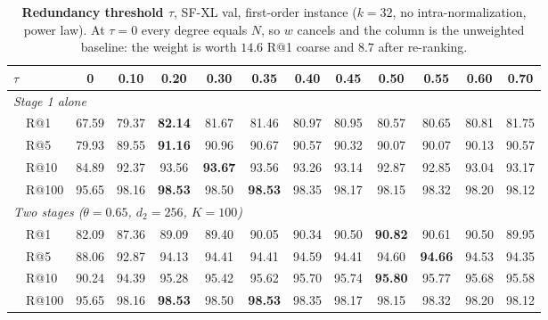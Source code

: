\begin{table}[t]
\caption{\textbf{Redundancy threshold $\tau$}, SF-XL val, first-order instance ($k{=}32$, no intra-normalization, power law). At $\tau{=}0$ every degree equals $N$, so $w$ cancels and the column is the unweighted baseline: the weight is worth $14.6$ R@1 coarse and $8.7$ after re-ranking.}
\label{tab:cal-tau}
\begin{center}{\footnotesize\setlength{\tabcolsep}{3.4pt}
\begin{tabular}{lccccccccccc}
\toprule
$\tau$  & 0 & 0.10 & 0.20 & 0.30 & 0.35 & 0.40 & 0.45 & 0.50 & 0.55 & 0.60 & 0.70\\
\midrule
\multicolumn{12}{l}{\emph{Stage 1 alone}} \\
\ \ R@1  & 67.59 & 79.37 & \textbf{82.14} & 81.67 & 81.46 & 80.97 & 80.95 & 80.57 & 80.65 & 80.81 & 81.75\\
\ \ R@5  & 79.93 & 89.55 & \textbf{91.16} & 90.96 & 90.67 & 90.57 & 90.32 & 90.07 & 90.07 & 90.13 & 90.57\\
\ \ R@10  & 84.89 & 92.37 & 93.56 & \textbf{93.67} & 93.56 & 93.26 & 93.14 & 92.87 & 92.85 & 93.04 & 93.17\\
\ \ R@100  & 95.65 & 98.16 & \textbf{98.53} & 98.50 & \textbf{98.53} & 98.35 & 98.17 & 98.15 & 98.32 & 98.20 & 98.12\\
\midrule
\multicolumn{12}{l}{\emph{Two stages ($\theta{=}0.65$, $d_2{=}256$, $K{=}100$)}} \\
\ \ R@1  & 82.09 & 87.36 & 89.09 & 89.40 & 90.05 & 90.34 & 90.50 & \textbf{90.82} & 90.61 & 90.50 & 89.95\\
\ \ R@5  & 88.06 & 92.87 & 94.13 & 94.41 & 94.41 & 94.59 & 94.41 & 94.60 & \textbf{94.66} & 94.53 & 94.35\\
\ \ R@10  & 90.24 & 94.39 & 95.28 & 95.42 & 95.62 & 95.70 & 95.74 & \textbf{95.80} & 95.77 & 95.68 & 95.58\\
\ \ R@100  & 95.65 & 98.16 & \textbf{98.53} & 98.50 & \textbf{98.53} & 98.35 & 98.17 & 98.15 & 98.32 & 98.20 & 98.12\\
\bottomrule
\end{tabular}}\end{center}

\par{}
\end{table}
